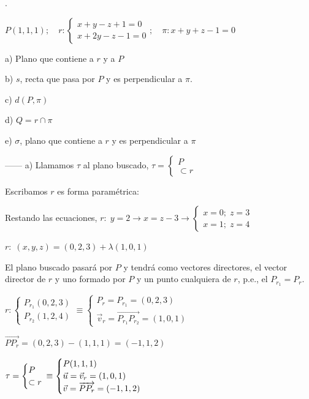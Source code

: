 \begin{ejre}.

\noindent $P(1,1,1);\quad r:\begin{cases}x+y-z+1=0\\x+2y-z-1=0\end{cases};\quad \pi:x+y+z-1=0$

\noindent a) Plano que contiene a $r$ y a $P$

\noindent b) $s$, recta que pasa por $P$ y es perpendicular a $\pi$. 

\noindent c) $d(P,\pi)$

\noindent d) $Q=r\cap \pi$

\noindent e) $\sigma$, plano que contiene a $r$ y es perpendicular a $\pi$
	
	
\end{ejre}
\begin{proofw}\renewcommand{\qedsymbol}{$\diamond$}	
	
\noindent ------ a) Llamamos $\tau$ al plano buscado, $\tau
=\begin{cases} P \\ \subset r  \end{cases}$

\noindent Escribamos $r$ es forma paramétrica:

\noindent Restando las ecuaciones, $r:\; y=2 \to x=z-3 \to \begin{cases} x=0; \; z=3 \\ x=1;\; z=4 \end{cases}$

\noindent $r:\; (x,y,z)=(0,2,3)+\lambda(1,0,1)$

\noindent El plano buscado pasará por $P$ y tendrá como vectores directores, el vector director de $r$ y uno formado por $P$ y un punto cualquiera de $r$, p.e., el $P_{r_1}=P_r$.

\noindent $r:\begin{cases} P_{r_1}(0,2,3) \\ P_{r_2}(1,2,4)\end{cases} \equiv \begin{cases} P_r=P_{r_1}=(0,2,3) \\ \vec v_r=\overrightarrow{P_{r_1}P_{r_2}}=(1,0,1) \end{cases}$

\noindent $\overrightarrow{PP_r}=(0,2,3)-(1,1,1)=(-1,1,2)$

\noindent  $\tau
=\begin{cases}  P \\ \subset r \end{cases} \hspace{-3mm} \equiv \begin{cases}  P (1,1,1) \\ \vec u=\vec v_r=(1,0,1) \\ \vec v = \overrightarrow{PP_r}=(-1,1,2) \end{cases}$


\end{proofw}
